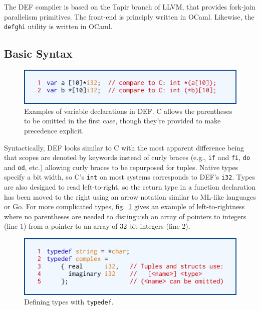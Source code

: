 The DEF compiler is based on the Tapir branch of LLVM, that provides fork-join parallelism primitives.\cite{TAPIR}\cite{LLVM}  The front-end is principly written in OCaml.  Likewise, the \texttt{defghi} utility is written in OCaml.\cite{DEF}

\subsection{Basic Syntax}

\begin{figure}[htbp!]
        \centering
        \includegraphics[scale=0.25]{gfx/types}
        \caption{Examples of variable declarations in DEF.  C allows the parentheses to be omitted in the first case, though they're provided to make precedence explicit.}
        \label{fig:types}
\end{figure}

Syntactically, DEF looks similar to C with the most apparent difference being that scopes are denoted by keywords instead of curly braces (e.g., \texttt{if} and \texttt{fi}, \texttt{do} and \texttt{od}, etc.) allowing curly braces to be repurposed for tuples.  Native types specify a bit width, so C's \texttt{int} on most systems corresponds to DEF's \texttt{i32}.  Types are also designed to read left-to-right, so the return type in a function declaration has been moved to the right using an arrow notation similar to ML-like languages or Go.  For more complicated types, fig.~\ref{fig:types} gives an example of left-to-rightness where no parentheses are needed to distinguish an array of pointers to integers (line 1) from a pointer to an array of 32-bit integers (line 2).

\begin{figure}[htbp!]
        \centering
        \includegraphics[scale=0.25]{gfx/typedef}
        \caption{Defining types with \texttt{typedef}.}
        \label{fig:typedef}
\end{figure}

